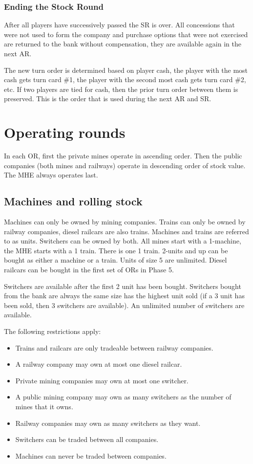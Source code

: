 \documentclass[a4paper,twocolumn]{article}
\begin{document}
\subsubsection{Ending the Stock Round}
After all players have successively passed the SR is over. All concessions that
were not used to form the company and purchase options that were not exercised
are returned to the bank without compensation, they are available again in the
next AR.

The new turn order is determined based on player cash, the player with the most
cash gets turn card \#1, the player with the second most cash gets turn card
\#2, etc. If two players are tied for cash, then the prior turn order between
them is preserved. This is the order that is used during the next AR and SR.

\section{Operating rounds}
In each OR, first the private mines operate in ascending order. Then the public
companies (both mines and railways) operate in descending order of stock value.
The MHE always operates last.

\subsection{Machines and rolling stock}

Machines can only be owned by mining companies. Trains can only be owned by
railway companies, diesel railcars are also trains. Machines and trains are
referred to as units. Switchers can be owned by both. All mines start with a
1-machine, the MHE starts with a 1 train. There is one 1 train. 2-units and up
can be bought as either a machine or a train. Units of size 5 are unlimited.
Diesel railcars can be bought in the first set of ORs in Phase 5.

Switchers are available after the first 2 unit has been bought. Switchers bought
from the bank are always the same size has the highest unit sold (if a 3 unit
has been sold, then 3 switchers are available). An unlimited number of switchers
are available.

The following restrictions apply:
\begin{itemize}
	\item Trains and railcars are only tradeable between railway companies.
	\item A railway company may own at most one diesel railcar.
	\item Private mining companies may own at most one switcher.
	\item A public mining company may own as many switchers as the number of
	mines that it owns.
	\item Railway companies may own as many switchers as they want.
	\item Switchers can be traded between all companies.
	\item Machines can never be traded between companies.
\end{itemize}
\end{document}
